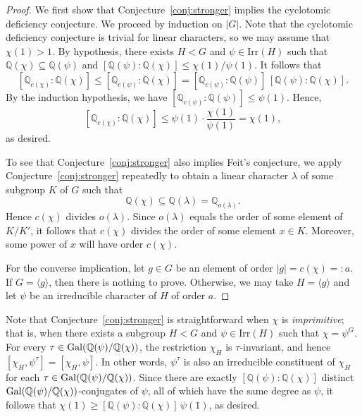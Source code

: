 \documentclass[12pt]{amsart}
\theoremstyle{definition}
\numberwithin{equation}{section}
\newcommand{\Irr}{{\mathrm {Irr}}}
\newcommand{\Gal}{{\rm Gal}}
\newcommand{\QQ}{{\mathbb Q}}
\begin{document}
\begin{proof}
We first show that Conjecture~\ref{conj:stronger} implies the
cyclotomic deficiency conjecture. We proceed by induction on $|G|$.
Note that the cyclotomic deficiency conjecture is trivial for linear
characters, so we may assume that $\chi(1) > 1$. By hypothesis,
there exists $H < G$ and $\psi \in \Irr(H)$ such that $\QQ(\chi)
\subseteq \QQ(\psi)$ and $[\QQ(\psi) : \QQ(\chi)] \le
\chi(1)/\psi(1)$. It follows that
\[
[\QQ_{c(\chi)} : \QQ(\chi)] \le [\QQ_{c(\psi)} : \QQ(\chi)] =
[\QQ_{c(\psi)} : \QQ(\psi)] \, [\QQ(\psi) : \QQ(\chi)].
\]
By the induction hypothesis, we have $[\QQ_{c(\psi)} : \QQ(\psi)]
\le \psi(1)$. Hence,
\[
[\QQ_{c(\chi)} : \QQ(\chi)] \le \psi(1) \cdot
\frac{\chi(1)}{\psi(1)} = \chi(1),
\]
as desired.

To see that Conjecture~\ref{conj:stronger} also implies Feit's
conjecture, we apply Conjecture~\ref{conj:stronger} repeatedly to
obtain a linear character $\lambda$ of some subgroup $K$ of $G$ such
that
\[
\mathbb{Q}(\chi) \subseteq \mathbb{Q}(\lambda) =
\mathbb{Q}_{o(\lambda)}.
\]
Hence $c(\chi)$ divides $o(\lambda)$. Since $o(\lambda)$ equals the
order of some element of $K/K'$, it follows that $c(\chi)$ divides
the order of some element $x \in K$. Moreover, some power of $x$
will have order $c(\chi)$.


For the converse implication, let $g \in G$ be an element of order
$|g| = c(\chi) =: a$. If $G = \langle g \rangle$, then there is
nothing to prove. Otherwise, we may take $H = \langle g \rangle$ and
let $\psi$ be an irreducible character of $H$ of order $a$.
\end{proof}

Note that Conjecture~\ref{conj:stronger} is straightforward when
$\chi$ is \emph{imprimitive}; that is, when there exists a subgroup
$H < G$ and $\psi \in \Irr(H)$ such that $\chi = \psi^G$. For every
$\tau \in \Gal(\QQ(\psi)/\QQ(\chi))$, the restriction $\chi_H$ is
$\tau$-invariant, and hence $[\chi_H, \psi^\tau] = [\chi_H, \psi]$.
In other words, $\psi^\tau$ is also an irreducible constituent of
$\chi_H$ for each $\tau \in \Gal(\QQ(\psi)/\QQ(\chi))$. Since there
are exactly $[\QQ(\psi) : \QQ(\chi)]$ distinct
$\Gal(\QQ(\psi)/\QQ(\chi))$-conjugates of $\psi$, all of which have
the same degree as $\psi$, it follows that $\chi(1) \geq [\QQ(\psi)
: \QQ(\chi)] \, \psi(1)$, as desired.
\end{document}
